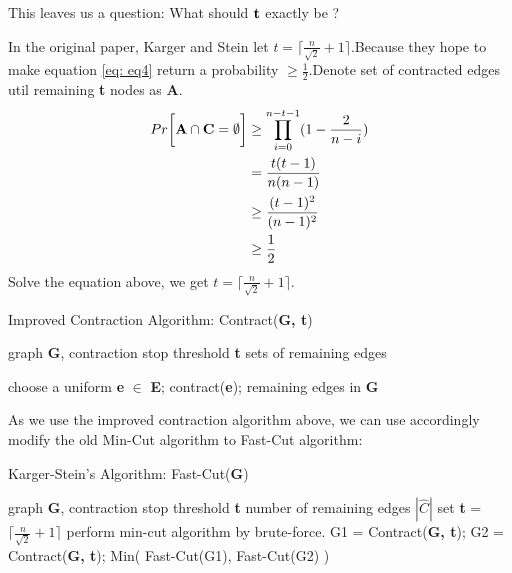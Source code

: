 \documentclass[a4paper, 12pt, titlepage]{article}
\begin{document}
This leaves us a question: What should ${\bf t}$ exactly be ?

In the original paper, Karger and Stein let $t = \lceil \frac{n}{\sqrt{2}} + 1 \rceil$.Because they hope to make equation \ref{eq: eq4}
return a probability $\geq \frac{1}{2}$.Denote set of contracted edges util remaining \textbf{t} nodes as \textbf{A}.
\begin{equation}\label{eq: eq5}
    \begin{aligned}
        Pr \bigg[ {\bf A} \cap {\bf C} = \emptyset \bigg] &\geq \prod_{i = 0}^{n - t - 1} (1 - \frac{2}{n - i}) \\
                                                          &= \frac{t (t - 1)}{n (n - 1)} \\
                                                          &\geq \frac{(t - 1)^2}{(n - 1)^2} \\
                                                          &\geq \frac{1}{2}                                       
    \end{aligned}
\end{equation}
Solve the equation above, we get $t = \lceil \frac{n}{\sqrt{2}} + 1 \rceil$.


\begin{algorithm}[h]
    \caption{Improved Contraction Algorithm: Contract({\bf G, t})}
    \begin{algorithmic}
        \Require graph {\bf G}, contraction stop threshold {\bf t}
        \Ensure sets of remaining edges

            \State choose a uniform {\bf e} $\in$ {\bf E};
            \State contract({\bf e});
        \EndWhile
        \State \Return remaining edges in {\bf G}
    \end{algorithmic}
\end{algorithm}

As we use the improved contraction algorithm above, we can use accordingly modify the old Min-Cut algorithm to Fast-Cut algorithm:
\begin{algorithm}[h]
    \caption{Karger-Stein's Algorithm: Fast-Cut({\bf G})}
    \begin{algorithmic}[1]
        \Require graph {\bf G}, contraction stop threshold {\bf t}
        \Ensure number of remaining edges {\bf$|\hat{C}|$}
        \State set {\bf t} = $\lceil \frac{n}{\sqrt{2}} + 1 \rceil$
            \State perform min-cut algorithm by brute-force.
        \Else
            \State G1 = Contract({\bf G, t});
            \State G2 = Contract({\bf G, t});
        \EndIf
        \State \Return Min( {Fast-Cut(G1), Fast-Cut(G2)} )
    \end{algorithmic}
\end{algorithm}
\end{document}
